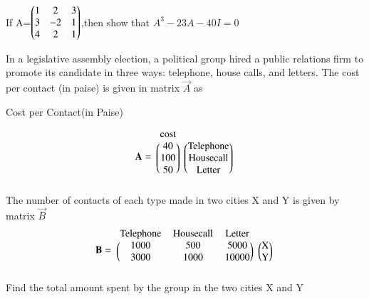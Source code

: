     \item If A=$\begin{pmatrix}1 &2 &3\\3 &-2 &1\\4 &2 &1\end{pmatrix}$,then show that $A^3-23A-40I=0$
    
    
    
\item In a legislative assembly election, a political
group hired a public relations firm to promote
its candidate in three ways: telephone, house
calls, and letters. The cost per contact (in paise)
is given in matrix $\vec{A}$ as
\begin{center}
Cost per Contact(in Paise)
\end{center}
\begin{align}
    \vec{A}=
    \begin{blockarray}{cc}
    \text{cost}\\
    \begin{block}{(c)(c)}
    40 &\text{Telephone}\\
    100&\text{Housecall} \\
    50&\text{Letter}\\
    \end{block}
    \end{blockarray}
\end{align}
The number of contacts of each type made in
two cities X and Y is given by matrix $\vec{B}$
\begin{align}
    \vec{B} =
    \begin{blockarray}{cccc}
    \text{Telephone} & \text{Housecall} & \text{Letter} \\
    \begin{block}{(ccc)(c)}
    1000 & 500 & 5000 & \text{X}\\
    3000 & 1000 & 10000 & \text{Y} \\
    \end{block}
    \end{blockarray}
\end{align}
Find the total
amount spent by the group in the two cities
X and Y
%
\solution


